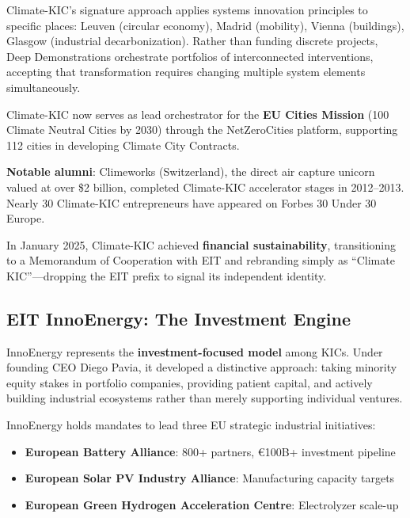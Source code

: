 \documentclass[../main.tex]{subfiles}
\begin{document}
\begin{insightbox}
Climate-KIC's signature approach applies systems innovation principles to specific places: Leuven (circular economy), Madrid (mobility), Vienna (buildings), Glasgow (industrial decarbonization). Rather than funding discrete projects, Deep Demonstrations orchestrate portfolios of interconnected interventions, accepting that transformation requires changing multiple system elements simultaneously.
\end{insightbox}

Climate-KIC now serves as lead orchestrator for the \textbf{EU Cities Mission} (100 Climate Neutral Cities by 2030) through the NetZeroCities platform, supporting 112 cities in developing Climate City Contracts.

\textbf{Notable alumni}: Climeworks (Switzerland), the direct air capture unicorn valued at over \$2 billion, completed Climate-KIC accelerator stages in 2012--2013. Nearly 30 Climate-KIC entrepreneurs have appeared on Forbes 30 Under 30 Europe.

In January 2025, Climate-KIC achieved \textbf{financial sustainability}, transitioning to a Memorandum of Cooperation with EIT and rebranding simply as ``Climate KIC''---dropping the EIT prefix to signal its independent identity.

\subsection*{EIT InnoEnergy: The Investment Engine}

InnoEnergy represents the \textbf{investment-focused model} among KICs. Under founding CEO Diego Pavia, it developed a distinctive approach: taking minority equity stakes in portfolio companies, providing patient capital, and actively building industrial ecosystems rather than merely supporting individual ventures.

InnoEnergy holds mandates to lead three EU strategic industrial initiatives:
\begin{itemize}[leftmargin=*, itemsep=0.1em]
\item \textbf{European Battery Alliance}: 800+ partners, €100B+ investment pipeline
\item \textbf{European Solar PV Industry Alliance}: Manufacturing capacity targets
\item \textbf{European Green Hydrogen Acceleration Centre}: Electrolyzer scale-up
\end{itemize}
\end{document}
